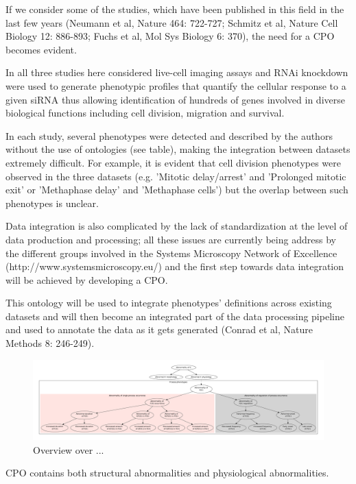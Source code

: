 \documentclass{bioinfo}
\begin{document}
If we consider some of the studies, which have been published in this
field in the last few years (Neumann et al, Nature 464: 722-727;
Schmitz et al, Nature Cell Biology 12: 886-893; Fuchs et al, Mol Sys
Biology 6: 370), the need for a CPO becomes evident.

In all three studies here considered live-cell imaging assays and RNAi
knockdown were used to generate phenotypic profiles that quantify the
cellular response to a given siRNA thus allowing identification of
hundreds of genes involved in diverse biological functions including
cell division, migration and survival.

In each study, several phenotypes were detected and described by the
authors without the use of ontologies (see table), making the
integration between datasets extremely difficult. For example, it is
evident that cell division phenotypes were observed in the three
datasets (e.g. 'Mitotic delay/arrest' and 'Prolonged mitotic exit' or
'Methaphase delay' and 'Methaphase cells') but the overlap between
such phenotypes is unclear.

Data integration is also complicated by the lack of standardization at
the level of data production and processing; all these issues are
currently being address by the different groups involved in the
Systems Microscopy Network of Excellence
(http://www.systemsmicroscopy.eu/) and the first step towards data
integration will be achieved by developing a CPO.

This ontology will be used to integrate phenotypes' definitions across
existing datasets and will then become an integrated part of the data
processing pipeline and used to annotate the data as it gets generated
(Conrad et al, Nature Methods 8: 246-249).

\begin{figure}[h]
  \centering
  \includegraphics[width=\textwidth,
  height=.33\textheight]{overview.pdf}
  \caption{Overview over ...\label{fig:overview}}
\end{figure}

CPO contains both structural abnormalities and physiological
abnormalities.
\end{document}
